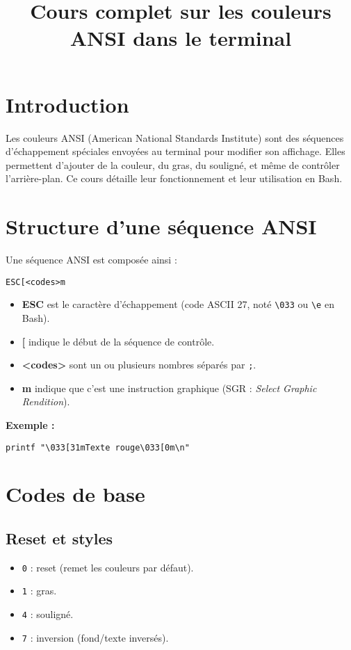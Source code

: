 \documentclass[11pt,a4paper]{article}
\title{Cours complet sur les couleurs ANSI dans le terminal}
\author{}
\date{}
\begin{document}
\maketitle
\tableofcontents

\section*{Introduction}
Les couleurs ANSI (American National Standards Institute) sont des séquences d’échappement spéciales envoyées au terminal pour modifier son affichage. Elles permettent d’ajouter de la couleur, du gras, du souligné, et même de contrôler l’arrière-plan. Ce cours détaille leur fonctionnement et leur utilisation en Bash.

\section{Structure d’une séquence ANSI}
Une séquence ANSI est composée ainsi :
\begin{verbatim}
ESC[<codes>m
\end{verbatim}

\begin{itemize}
  \item \textbf{ESC} est le caractère d’échappement (code ASCII 27, noté \verb|\033| ou \verb|\e| en Bash).
  \item \textbf{[} indique le début de la séquence de contrôle.
  \item \textbf{<codes>} sont un ou plusieurs nombres séparés par \verb|;|.
  \item \textbf{m} indique que c’est une instruction graphique (SGR : \emph{Select Graphic Rendition}).
\end{itemize}

\textbf{Exemple :}
\begin{lstlisting}
printf "\033[31mTexte rouge\033[0m\n"
\end{lstlisting}

\section{Codes de base}
\subsection*{Reset et styles}
\begin{itemize}
  \item \texttt{0} : reset (remet les couleurs par défaut).
  \item \texttt{1} : gras.
  \item \texttt{4} : souligné.
  \item \texttt{7} : inversion (fond/texte inversés).
\end{itemize}
\end{document}

